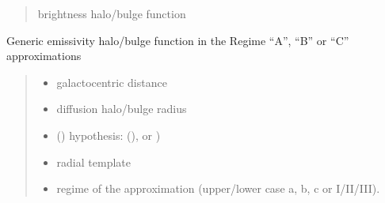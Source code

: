 \documentclass[letterpaper,10pt,english]{sphinxmanual}
\begin{document}
\begin{fulllineitems}
\begin{quote}
\begin{description}
\begin{itemize}
\end{itemize}

\sphinxAtStartPar
brightness halo/bulge function

\end{description}\end{quote}

\end{fulllineitems}


\begin{fulllineitems}
\label{\detokenize{diffsph.profiles:diffsph.profiles.hfactors.H_emissivity}}
\pysigstartsignatures
{}
\pysigstopsignatures
\sphinxAtStartPar
Generic emissivity halo/bulge function in the Regime “A”, “B” or “C” approximations
\begin{quote}\begin{description}
\begin{itemize}
\item {} 
\sphinxAtStartPar
{} \textendash{} galactocentric distance

\item {} 
\sphinxAtStartPar
{} \textendash{} diffusion halo/bulge radius

\item {} 
\sphinxAtStartPar
{} () \textendash{} hypothesis:  (),  or )

\item {} 
\sphinxAtStartPar
{} \textendash{} radial template

\item {} 
\sphinxAtStartPar
{} \textendash{} regime of the approximation (upper/lower case a, b, c or I/II/III).


\end{itemize}
\end{description}
\end{quote}
\end{fulllineitems}
\end{document}
